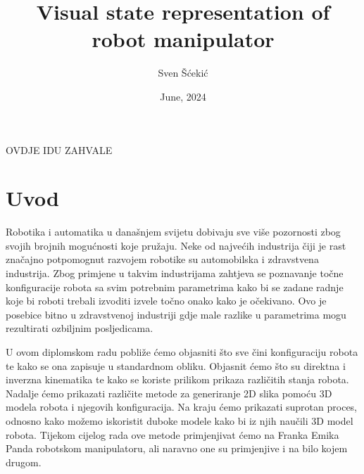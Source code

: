 \documentclass[times, utf8, diplomskirad]{fer}
\title{Visual state representation of robot manipulator}
\author{Sven Šćekić}
\date{June, 2024}
\begin{document}
\maketitle






\begin{zahvale}
    OVDJE IDU ZAHVALE
\end{zahvale}


\mainmatter


\tableofcontents


\chapter{Uvod}
\label{pog:uvod}
\hspace{\parindent}Robotika i automatika u današnjem svijetu dobivaju sve više pozornosti zbog svojih brojnih mogućnosti koje pružaju.
Neke od najvećih industrija čiji je rast značajno potpomognut razvojem robotike su automobilska i zdravstvena industrija.
Zbog primjene u takvim industrijama zahtjeva se poznavanje točne konfiguracije robota sa svim potrebnim parametrima kako
bi se zadane radnje koje bi roboti trebali izvoditi izvele točno onako kako je očekivano.
Ovo je posebice bitno u zdravstvenoj industriji gdje male razlike u parametrima mogu rezultirati ozbiljnim posljedicama.

U ovom diplomskom radu pobliže ćemo objasniti što sve čini konfiguraciju robota te kako se ona zapisuje u standardnom obliku.
Objasnit ćemo što su direktna i inverzna kinematika te kako se koriste prilikom prikaza različitih stanja robota.
Nadalje ćemo prikazati različite metode za generiranje 2D slika pomoću 3D modela robota i njegovih konfiguracija.
Na kraju ćemo prikazati suprotan proces, odnosno kako možemo iskoristit duboke modele kako bi iz njih naučili 3D model robota.
Tijekom cijelog rada ove metode primjenjivat ćemo na Franka Emika Panda robotskom manipulatoru, ali naravno one su primjenjive i na bilo kojem drugom.
\end{document}

